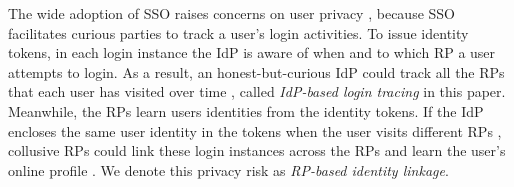 The wide adoption of SSO raises concerns on user privacy \cite{maler2008venn,NIST2017draft,BrowserID,SPRESSO},
 because SSO facilitates curious parties to track a user's login activities.
To issue identity tokens,
in each login instance
 the IdP is aware of when and to which RP a user attempts to login.
As a result, an honest-but-curious IdP could track all the RPs that each user has visited over time \cite{BrowserID,SPRESSO},
 called {\em IdP-based login tracing} in this paper.
Meanwhile, the RPs learn users identities from the identity tokens.
If the IdP encloses the same user identity in the tokens when the user visits different RPs \cite{Google, FirefoxAccount},
     collusive RPs could link these login instances across the RPs %
      and learn the user's online profile \cite{maler2008venn}.
We denote this privacy risk as {\em RP-based identity linkage}.


%

